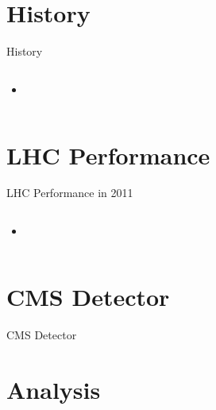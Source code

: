 \documentclass[t, 8pt]{beamer}
\begin{document}
\section{History}

\begin{frame}{History}
  \begin{columns}[c]
  \begin{itemize}
    \item 
  \end{itemize}
  \end{columns}
\end{frame}

\section{LHC Performance}

\begin{frame}{LHC Performance in 2011}
  \begin{columns}[c]
  \begin{itemize}
    \item 
  \end{itemize}
  \end{columns}
\end{frame}

\section{CMS Detector}

\begin{frame}{CMS Detector}
\end{frame}

\section{Analysis}
\end{document}
